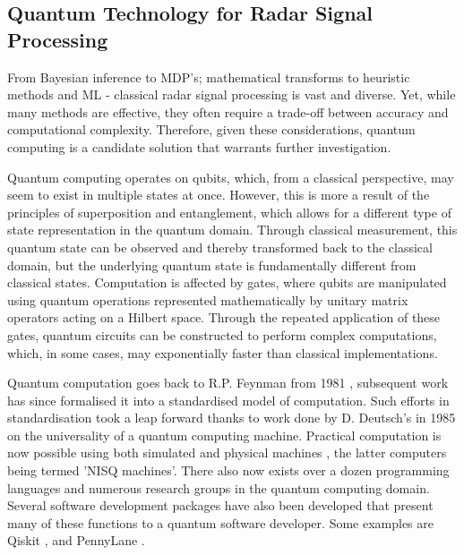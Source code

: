 \subsection{Quantum Technology for Radar Signal Processing}


From Bayesian inference to \ac{MDP}'s; mathematical transforms to heuristic methods and \ac{ML} - classical radar signal processing is vast and diverse.
Yet, while many methods are effective, they often require a trade-off between accuracy and computational complexity.
Therefore, given these considerations, quantum computing is a candidate solution that warrants further investigation.

Quantum computing operates on qubits, which, from a classical perspective, may seem to exist in multiple states at once.
However, this is more a result of the principles of superposition and entanglement, which allows for a different type of state representation in the quantum domain.
Through classical measurement, this quantum state can be observed and thereby transformed back to the classical domain, but the underlying quantum state is fundamentally different from classical states.
Computation is affected by gates, where qubits are manipulated using quantum operations represented mathematically by unitary matrix operators acting on a Hilbert space.
Through the repeated application of these gates, quantum circuits can be constructed to perform complex computations, which, in some cases, may exponentially faster than classical implementations.

Quantum computation goes back to R.P. Feynman from 1981 \cite{feynman_simulating_1982}, subsequent work has since formalised it into a standardised model of computation.
Such efforts in standardisation took a leap forward thanks to work done by D. Deutsch's \cite{deutsch_quantum_1985} in 1985 on the universality of a quantum computing machine.
Practical computation is now possible using both simulated \cite{noauthor_quantum_nodate, noauthor_simulators_nodate} and physical machines \cite{noauthor_ibm_2015, noauthor_microsoft_nodate}, the latter computers being termed '\ac{NISQ} machines'.
There also now exists over a dozen programming languages and numerous research groups \cite{garhwal_quantum_2021} in the quantum computing domain.
Several software development packages have also been developed that present many of these functions to a quantum software developer.
Some examples are Qiskit \cite{qiskit_contributors_qiskit_2023}, and PennyLane \cite{noauthor_pennylane_nodate}.


